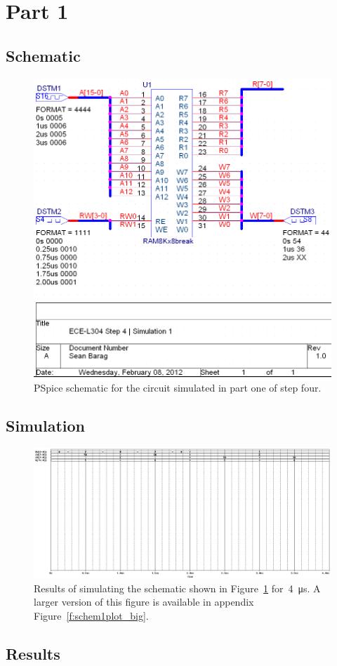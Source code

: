 \section{Part 1}

\subsection{Schematic}
\begin{figure}[H]
\centering
	\includegraphics[width=.8\textwidth]{img/shot/schem1.png}
	\parbox{.8\textwidth}{
	\caption[Part 1 Schematic]{PSpice schematic for the circuit simulated in
	part one of step four.}
	\label{f:schem1}}
\end{figure}

\subsection{Simulation}
\begin{figure}[H]
\centering
	\includegraphics[width=.8\textwidth]{img/shot/sim1_plot.png}
	\parbox{.8\textwidth}{
	\caption[Part 1 Simulation Results]{Results of simulating the schematic
	shown in Figure~\ref{f:schem1} for~\SI{4}{\micro\second}.  A larger version
	of this figure is available in appendix Figure~\ref{f:schem1plot_big}.}
	\label{f:schem1plot}}
\end{figure}

\subsection{Results}
